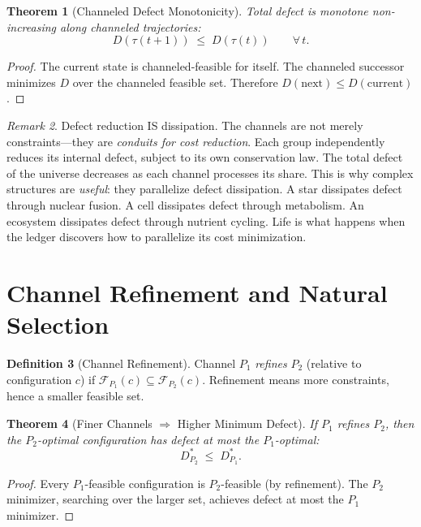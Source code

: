 \documentclass[11pt,a4paper]{article}
\theoremstyle{plain}
\newtheorem{theorem}{Theorem}[section]
\theoremstyle{definition}
\newtheorem{definition}[theorem]{Definition}
\theoremstyle{remark}
\newtheorem{remark}[theorem]{Remark}
\newcommand{\F}{\mathcal{F}}
\begin{document}
\begin{theorem}[Channeled Defect Monotonicity]\label{thm:monotone}
Total defect is monotone non-increasing along channeled trajectories:
\[
D(\tau(t{+}1)) \;\le\; D(\tau(t)) \qquad \forall\, t.
\]
\end{theorem}

\begin{proof}
The current state is channeled-feasible for itself.
The channeled successor minimizes $D$ over the channeled feasible set.
Therefore $D(\text{next}) \le D(\text{current})$.
\end{proof}

\begin{remark}
Defect reduction IS dissipation.
The channels are not merely constraints---they are \emph{conduits for cost reduction}.
Each group independently reduces its internal defect, subject to its own conservation law.
The total defect of the universe decreases as each channel processes its share.
This is why complex structures are \emph{useful}: they parallelize defect dissipation.
A star dissipates defect through nuclear fusion.
A cell dissipates defect through metabolism.
An ecosystem dissipates defect through nutrient cycling.
Life is what happens when the ledger discovers how to parallelize its cost minimization.
\end{remark}

\section{Channel Refinement and Natural Selection}\label{sec:selection}

\begin{definition}[Channel Refinement]\label{def:refinement}
Channel $P_1$ \emph{refines} $P_2$ (relative to configuration $c$) if $\F_{P_1}(c) \subseteq \F_{P_2}(c)$.
Refinement means more constraints, hence a smaller feasible set.
\end{definition}

\begin{theorem}[Finer Channels $\Rightarrow$ Higher Minimum Defect]\label{thm:finer}
If $P_1$ refines $P_2$, then the $P_2$-optimal configuration has defect at most the $P_1$-optimal:
\[
D^*_{P_2} \;\le\; D^*_{P_1}.
\]
\end{theorem}

\begin{proof}
Every $P_1$-feasible configuration is $P_2$-feasible (by refinement).
The $P_2$ minimizer, searching over the larger set, achieves defect at most the $P_1$ minimizer.
\end{proof}
\end{document}

